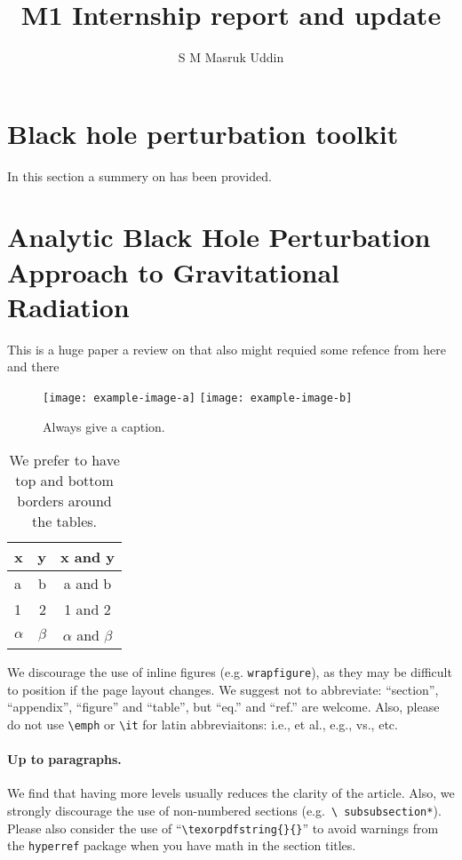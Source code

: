 \documentclass[a4paper,11pt]{article}
\title{\boldmath M1 Internship report and update}
\author{S M Masruk Uddin}
\affiliation{LUTH, L’Observatoire de Paris-PSL\\
5 place Jules Janssen, 92195 Meudon}
\begin{document}
\maketitle
\flushbottom

\section{Black hole perturbation toolkit }
\label{BHPTK}
In this section a summery on \cite{PhysRevD.73.024027}  has been provided. 



\section{Analytic Black Hole Perturbation Approach to Gravitational Radiation}
 This is a huge paper \cite{Sasaki2003} a review on that also might requied  some refence from here and there 
\begin{figure}[htbp]
\centering
\texttt{[image: example-image-a]}
\qquad
\texttt{[image: example-image-b]}
\caption{Always give a caption.\label{fig:i}}
\end{figure}

\begin{table}[htbp]
\centering
\begin{tabular}{lr|c}
\hline
x&y&x and y\\
\hline
a & b & a and b\\
1 & 2 & 1 and 2\\
$\alpha$ & $\beta$ & $\alpha$ and $\beta$\\
\hline
\end{tabular}
\caption{We prefer to have top and bottom borders around the tables.\label{tab:i}}
\end{table}

We discourage the use of inline figures (e.g. \texttt{wrapfigure}), as they may be
difficult to position if the page layout changes.
\cite{Sasaki2003} \cite{PhysRevD.73.024027}
We suggest not to abbreviate: ``section'', ``appendix'', ``figure''
and ``table'', but ``eq.'' and ``ref.'' are welcome. Also, please do
not use \texttt{\textbackslash emph} or \texttt{\textbackslash it} for
latin abbreviaitons: i.e., et al., e.g., vs., etc.


\paragraph{Up to paragraphs.} We find that having more levels usually
reduces the clarity of the article. Also, we strongly discourage the
use of non-numbered sections (e.g.~\texttt{\textbackslash
  subsubsection*}).  Please also consider the use of
``\texttt{\textbackslash texorpdfstring\{\}\{\}}'' to avoid warnings
from the \texttt{hyperref} package when you have math in the section titles.
\end{document}
